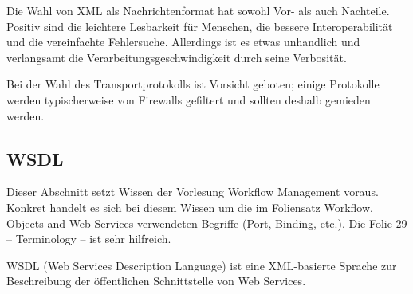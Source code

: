\documentclass[runningheads]{llncs}
\newcommand{\germanquote}[1]{\glqq{}#1\grqq{}}
\begin{document}
    Die Wahl von XML als Nachrichtenformat hat sowohl Vor- als auch Nachteile.
    Positiv sind die leichtere Lesbarkeit für Menschen, die bessere Interoperabilität und die vereinfachte Fehlersuche. Allerdings ist es etwas unhandlich und verlangsamt die Verarbeitungsgeschwindigkeit durch seine Verbosität.

    Bei der Wahl des Transportprotokolls ist Vorsicht geboten; einige Protokolle werden typischerweise von Firewalls gefiltert und sollten deshalb gemieden werden.

  \subsection{WSDL}
  \label{wsdl}
  \nocite{wk_wsdl}
    Dieser Abschnitt setzt Wissen der Vorlesung \germanquote{Workflow Management}\cite{wfm_site} voraus. Konkret handelt es sich bei diesem Wissen um die im Foliensatz \germanquote{Workflow, Objects and Web Services}\cite{wfm_ch7} verwendeten Begriffe (Port, Binding, etc.). Die Folie 29 -- Terminology -- ist sehr hilfreich.

    WSDL (Web Services Description Language) ist eine XML-basierte Sprache zur Beschreibung der öffentlichen Schnittstelle von Web Services.
\end{document}
